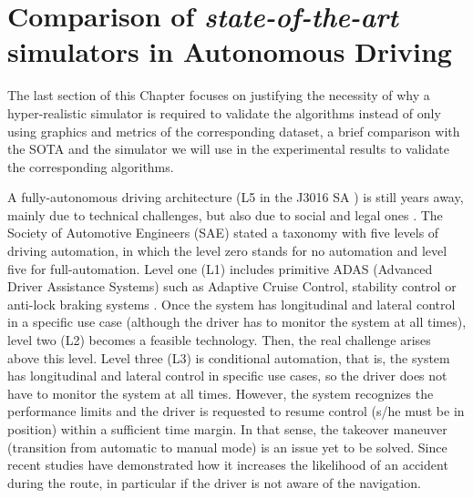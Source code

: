 \section{Comparison of \textit{state-of-the-art} simulators in Autonomous Driving}
\label{sec:2_sota_simulators_ad}

The last section of this Chapter focuses on justifying the necessity of why a hyper-realistic simulator is required to validate the algorithms instead of only using graphics and metrics of the corresponding dataset, a brief comparison with the \ac{SOTA} and the simulator we will use in the experimental results to validate the corresponding algorithms. 

A fully-autonomous driving architecture (L5 in the J3016 SA  \cite{taxonomy2016definitions}) is still years away, mainly due to technical challenges, but also due to social and legal ones \cite{matthaeia2015autonomous}. The Society of Automotive Engineers (SAE) stated a taxonomy with five levels \cite{taxonomy2016definitions} of driving automation, in which the level zero stands for no automation and level five for full-automation. Level one (L1) includes primitive ADAS (Advanced Driver Assistance Systems) such as Adaptive Cruise Control, stability control or anti-lock braking systems \cite{rajamani2011vehicle}. Once the system has longitudinal and lateral control in a specific use case (although the driver has to monitor the system at all times), level two (L2) becomes a feasible technology. Then, the real challenge arises above this level. Level three (L3) is conditional automation, that is, the system has longitudinal and lateral control in specific use cases, so the driver does not have to monitor the system at all times. However, the system recognizes the performance limits and the driver is requested to resume control (s/he must be in position) within a sufficient time margin. In that sense, the takeover maneuver (transition from automatic to manual mode) is an issue yet to be solved. Since recent studies \cite{gold2016taking} \cite{merat2014transition} have demonstrated how it increases the likelihood of an accident during the route, in particular if the driver is not aware of the navigation. 

